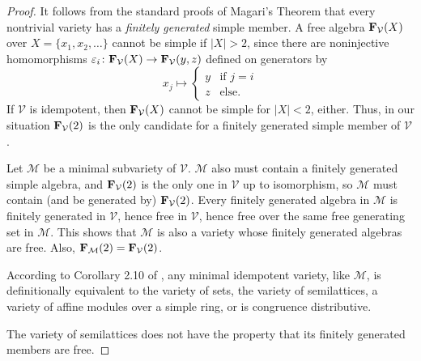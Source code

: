 \begin{proof}
  It follows from the standard proofs of Magari's Theorem that
  every nontrivial variety has a {\it finitely generated} simple member.
  A free algebra ${{\mathbf{\uppercase{f}}}}_{\mathcal V}(X)$ over $X = \{x_1,x_2,\ldots\}$
  cannot be simple if $|X|>2$, since there are
    noninjective homomorphisms
    $\varepsilon_i\colon {{\mathbf{\uppercase{f}}}}_{\mathcal V}(X)\to {{\mathbf{\uppercase{f}}}}_{\mathcal V}(y,z)$ 
defined on generators by 
  \begin{equation}\label{kernels}
    x_j\mapsto
    \begin{cases}
  y & \textrm{if $j=i$}\\
  z & \textrm{else}.
  \end{cases}   
  \end{equation}
  If $\mathcal V$ is idempotent, then ${{\mathbf{\uppercase{f}}}}_{\mathcal V}(X)$
  cannot be simple for $|X|<2$, either. Thus, in our situation
  ${{\mathbf{\uppercase{f}}}}_{\mathcal V}(2)$ is the only candidate for a finitely generated
  simple member of $\mathcal V$.

  Let $\mathcal M$ be a minimal subvariety of $\mathcal V$.
  $\mathcal M$ also must contain a finitely generated simple algebra,
  and ${{\mathbf{\uppercase{f}}}}_{\mathcal V}(2)$ is the only one in $\mathcal V$
  up to isomorphism, so
  $\mathcal M$ must contain (and be generated by)
  ${{\mathbf{\uppercase{f}}}}_{\mathcal V}(2)$. 
  Every finitely generated algebra in $\mathcal M$ is finitely
  generated in $\mathcal V$, hence free in $\mathcal V$,
  hence free over the same free generating set in $\mathcal M$.
  This shows that $\mathcal M$ is also a variety whose finitely generated
  algebras are free. Also, ${{\mathbf{\uppercase{f}}}}_{\mathcal M}(2)={{\mathbf{\uppercase{f}}}}_{\mathcal V}(2)$.

   According to Corollary 2.10 of \cite{kearnes},
  any minimal idempotent variety, like $\mathcal M$,
  is definitionally equivalent to the
  variety of sets, the variety of semilattices, a variety
  of affine modules over a simple ring, or is congruence distributive.
  
  The variety of semilattices does not have
  the property that its finitely generated members are free.


\end{proof}
